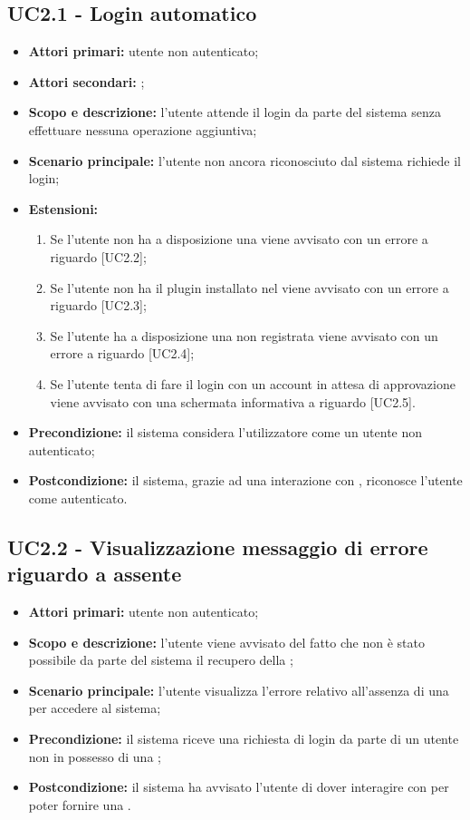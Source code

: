 \documentclass[AnalisiDeiRequisiti.tex]{subfiles}
\begin{document}
\subsection{UC2.1 - Login automatico}
\begin{itemize}
\item \textbf{Attori primari:} utente non autenticato;
\item \textbf{Attori secondari:} ;
\item \textbf{Scopo e descrizione:} l'utente attende il login da parte del sistema senza effettuare nessuna operazione aggiuntiva;
\item \textbf{Scenario principale:} l'utente non ancora riconosciuto dal sistema richiede il login;
\item \textbf{Estensioni:}
\begin{enumerate}
	\item Se l'utente non ha a disposizione una  viene avvisato con un errore a riguardo [UC2.2];
	\item Se l'utente non ha il plugin  installato nel  viene avvisato con un errore a riguardo [UC2.3];
	\item Se l'utente ha a disposizione una  non registrata viene avvisato con un errore a riguardo [UC2.4];
	\item Se l'utente tenta di fare il login con un account in attesa di approvazione viene avvisato con una schermata informativa a riguardo [UC2.5].
\end{enumerate}
\item \textbf{Precondizione:} il sistema considera l'utilizzatore come un utente non autenticato;
\item \textbf{Postcondizione:} il sistema, grazie ad una interazione con , riconosce l'utente come autenticato.
\end{itemize}
\subsection{UC2.2 - Visualizzazione messaggio di errore riguardo a  assente}
\begin{itemize}
	\item \textbf{Attori primari:} utente non autenticato;
	\item \textbf{Scopo e descrizione:} l'utente viene avvisato del fatto che non è stato possibile da parte del sistema il recupero della ;
	\item \textbf{Scenario principale:} l'utente visualizza l'errore relativo all'assenza di una  per accedere al sistema;
	\item \textbf{Precondizione:} il sistema riceve una richiesta di login da parte di un utente non in possesso di una ;
	\item \textbf{Postcondizione:} il sistema ha avvisato l'utente di dover interagire con  per poter fornire una .
\end{itemize}
\end{document}
